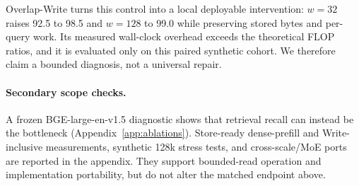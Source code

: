 Overlap-Write turns this control into a local deployable intervention:
$w{=}32$ raises 92.5 to 98.5 and $w{=}128$ to 99.0 while preserving stored
bytes and per-query work. Its measured wall-clock overhead exceeds the
theoretical FLOP ratios, and it is evaluated only on this paired synthetic
cohort. We therefore claim a bounded diagnosis, not a universal repair.

\paragraph{Secondary scope checks.}
A frozen BGE-large-en-v1.5 diagnostic shows that retrieval recall can instead be
the bottleneck (Appendix~\ref{app:ablations}). Store-ready dense-prefill and
Write-inclusive measurements, synthetic 128k stress tests, and cross-scale/MoE
ports are reported in the appendix. They support bounded-read operation and
implementation portability, but do not alter the matched endpoint above.
